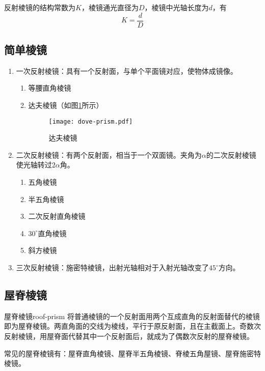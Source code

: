 \documentclass[cn,11pt]{elegantbook}
\begin{document}
反射棱镜的结构常数为$K$，棱镜通光直径为$D$，棱镜中光轴长度为$d$，有
\begin{equation}
K=\frac{d}{D}
\end{equation}

\subsection{简单棱镜}

\begin{enumerate}
	\item 一次反射棱镜：具有一个反射面，与单个平面镜对应，使物体成镜像。
	\begin{enumerate}
		\item 等腰直角棱镜
		\item 达夫棱镜（如图\ref{fig:dove-prism}所示）
		\begin{figure}[htbp]
			\centering
			\texttt{[image: dove-prism.pdf]}
			\caption{达夫棱镜}
			\label{fig:dove-prism}
		\end{figure}
	\end{enumerate}
	\item 二次反射棱镜：有两个反射面，相当于一个双面镜。夹角为$\alpha$的二次反射棱镜使光轴转过$2\alpha$角。
	\begin{enumerate}
		\item 五角棱镜
		\item 半五角棱镜
		\item 二次反射直角棱镜
		\item $30^{\circ}$直角棱镜
		\item 斜方棱镜
	\end{enumerate}
	\item 三次反射棱镜：施密特棱镜，出射光轴相对于入射光轴改变了$45^{\circ}$方向。
\end{enumerate}

\subsection{屋脊棱镜}

\begin{definition}{屋脊棱镜}{roof-prism}
	将普通棱镜的一个反射面用两个互成直角的反射面替代的棱镜即为屋脊棱镜。两直角面的交线为棱线，平行于原反射面，且在主截面上。奇数次反射棱镜，用屋脊面代替其中一个反射面后，就成为了偶数次反射的屋脊棱镜。
\end{definition}

常见的屋脊棱镜有：屋脊直角棱镜、屋脊半五角棱镜、脊棱五角屋镜、屋脊施密特棱镜。
\end{document}
